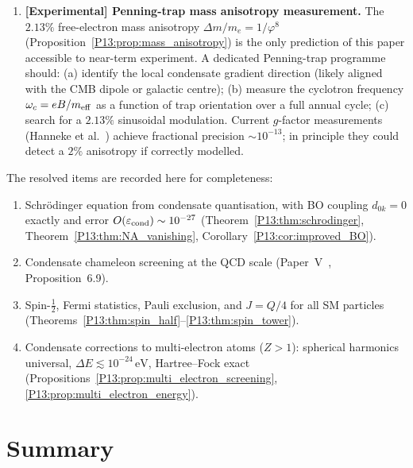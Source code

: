 \documentclass[11pt,a4paper]{article}
\theoremstyle{definition}
\theoremstyle{remark}
\newcommand{\vp}{\varphi}
\newcommand{\eps}{\varepsilon}
\begin{document}
\begin{enumerate}[noitemsep]

\item \textbf{[Experimental] Penning-trap mass anisotropy measurement.}
The $2.13\%$ free-electron mass anisotropy
$\Delta m/m_e = 1/\vp^8$ (Proposition~\ref{P13:prop:mass_anisotropy})
is the only prediction of this paper accessible to near-term experiment.
A dedicated Penning-trap programme should:
(a) identify the local condensate gradient direction
(likely aligned with the CMB dipole or galactic centre);
(b) measure the cyclotron frequency $\omega_c = eB/m_{\rm eff}$ as a
function of trap orientation over a full annual cycle;
(c) search for a $2.13\%$ sinusoidal modulation.
Current $g$-factor measurements (Hanneke et al.~\cite{Hanneke2008})
achieve fractional precision $\sim10^{-13}$;
in principle they could detect a $2\%$ anisotropy if correctly modelled.

\end{enumerate}

\noindent
The resolved items are recorded here for completeness:
\begin{enumerate}[noitemsep,label=(\roman*)]
\item Schr\"odinger equation from condensate quantisation, with BO coupling
  $d_{0k}=0$ exactly and error $O(\eps_{\rm cond})\sim10^{-27}$
  (Theorem~\ref{P13:thm:schrodinger}, Theorem~\ref{P13:thm:NA_vanishing},
  Corollary~\ref{P13:cor:improved_BO}).
\item Condensate chameleon screening at the QCD scale
  (Paper~V~\cite{Paper5}, Proposition~6.9).
\item Spin-$\tfrac{1}{2}$, Fermi statistics, Pauli exclusion, and
  $J=Q/4$ for all SM particles
  (Theorems~\ref{P13:thm:spin_half}--\ref{P13:thm:spin_tower}).
\item Condensate corrections to multi-electron atoms ($Z>1$):
  spherical harmonics universal, $\Delta E\lesssim10^{-24}\,\mathrm{eV}$,
  Hartree--Fock exact
  (Propositions~\ref{P13:prop:multi_electron_screening},
  \ref{P13:prop:multi_electron_energy}).
\end{enumerate}

\section{Summary}
\label{P13:sec:summary}
\end{document}
